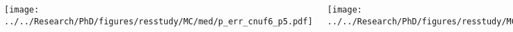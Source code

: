\documentclass[compress,10pt]{beamer}
\begin{document}
\begin{frame}
\begin{columns}[t]
    \end{columns}

     \begin{columns}[t]

        \centering

        {}\texttt{[image: ../../Research/PhD/figures/resstudy/MC/med/p\_err\_cnuf6\_p5.pdf]}

        \centering

        {}\texttt{[image: ../../Research/PhD/figures/resstudy/MC/med/p\_err\_cabs2\_p5.pdf]}

        \centering

        {}\texttt{[image: ../../Research/PhD/figures/resstudy/MC/med/p\_err\_keig\_p5.pdf]}

    \end{columns}

\end{frame}

\typeout{***********************************************************************************}
\end{document}
